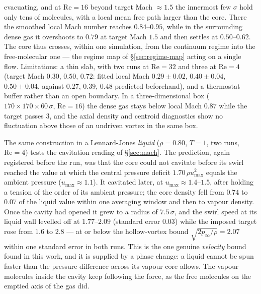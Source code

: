 \documentclass[11pt,a4paper]{article}
\begin{document}
evacuating, and at $\mathrm{Re}=16$ beyond target Mach $\approx1.5$ the innermost few $\sigma$ hold only tens of
molecules, with a local mean free path larger than the core. There the smoothed local Mach number reaches
$0.84$--$0.95$, while in the surrounding dense gas it overshoots to $0.79$ at target Mach $1.5$ and then settles
at $0.50$--$0.62$. The core thus crosses, within one simulation, from the continuum regime into the
free-molecular one --- the regime map of \S\ref{sec:regime-map} acting on a single flow. Limitations: a thin
slab, with two runs at $\mathrm{Re}=32$ and three at $\mathrm{Re}=4$ (target Mach $0.30$, $0.50$, $0.72$: fitted
local Mach $0.29\pm0.02$, $0.40\pm0.04$, $0.50\pm0.04$, against $0.27$, $0.39$, $0.48$ predicted beforehand), and a thermostat buffer
rather than an open boundary. In a three-dimensional box ($170\times170\times60\,\sigma$, $\mathrm{Re}=16$) the dense
gas stays below local Mach $0.87$ while the target passes $3$, and the axial density and centroid diagnostics
show no fluctuation above those of an undriven vortex in the same box.

The same construction in a Lennard-Jones \emph{liquid} ($\rho=0.80$, $T=1$, two runs, $\mathrm{Re}=4$) tests the
cavitation reading of \S\ref{sec:mach}. The prediction, again registered before the run, was that the core
could not cavitate before its swirl reached the value at which the central pressure deficit $1.70\,\rho
u_{\max}^2$ equals the ambient pressure ($u_{\max}\approx1.1$). It cavitated later, at $u_{\max}\approx1.4$--$1.5$,
after holding a tension of the order of its ambient pressure; the core density fell from $0.74$ to $0.07$ of the
liquid value within one averaging window and then to vapour density. Once the cavity had opened it grew to a
radius of $7.5\,\sigma$, and the swirl speed at its liquid wall levelled off at $1.77$--$2.09$ (standard error $0.03$)
while the imposed target rose from $1.6$ to $2.8$ --- at or below the hollow-vortex bound $\sqrt{2p_\infty/\rho}=2.07$
within one standard error in both runs. This is the one
genuine \emph{velocity} bound found in this work, and it is supplied by a phase change: a liquid cannot be spun
faster than the pressure difference across its vapour core allows. The vapour molecules inside the cavity keep
following the force, as the free molecules on the emptied axis of the gas did.
\end{document}
